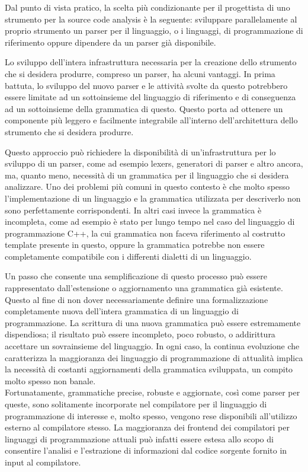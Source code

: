 Dal punto di vista pratico, la scelta più condizionante per il progettista di
uno strumento per la source code analysis è la seguente: sviluppare
parallelamente al proprio strumento un parser per il linguaggio, o i linguaggi,
di programmazione di riferimento oppure dipendere da un parser già disponibile.

Lo sviluppo dell’intera infrastruttura necessaria per la creazione dello
strumento che si desidera produrre, compreso un parser, ha alcuni vantaggi. In
prima battuta, lo sviluppo del nuovo parser e le attività svolte da questo
potrebbero essere limitate ad un sottoinsieme del linguaggio di riferimento e di
conseguenza ad un sottoinsieme della grammatica di questo. Questo porta ad
ottenere un componente più leggero e facilmente integrabile all'interno
dell'architettura dello strumento che si desidera produrre.

Questo approccio può richiedere la disponibilità di un’infrastruttura per lo
sviluppo di un parser, come ad esempio lexers, generatori di parser e altro
ancora, ma, quanto meno, necessità di un grammatica per il linguaggio che si
desidera analizzare. Uno dei problemi più comuni in questo contesto è che molto
spesso l’implementazione di un linguaggio e la grammatica utilizzata per
descriverlo non sono perfettamente corrispondenti. In altri casi invece la
grammatica è incompleta, come ad esempio è stato per lungo tempo nel caso del
linguaggio di programmazione C++, la cui grammatica non faceva riferimento al
costrutto template presente in questo, oppure la grammatica potrebbe non essere
completamente compatibile con i differenti dialetti di un linguaggio.

Un passo che consente una semplificazione di questo processo può essere
rappresentato dall'estensione o aggiornamento una grammatica già esistente.
Questo al fine di non dover necessariamente definire una formalizzazione
completamente nuova dell'intera grammatica di un linguaggio di programmazione.
La scrittura di una nuova grammatica può essere estremamente dispendiosa; il
risultato può essere incompleto, poco robusto, o addirittura accettare un
sovrainsieme del linguaggio. In ogni caso, la continua evoluzione che
caratterizza la maggioranza dei linguaggio di programmazione di attualità
implica la necessità di costanti aggiornamenti della grammatica sviluppata, un
compito molto spesso non banale.\\

Fortunatamente, grammatiche precise, robuste e aggiornate, così come parser per
queste, sono solitamente incorporate nel compilatore per il linguaggio di
programmazione di interesse e, molto spesso, vengono rese disponibili
all’utilizzo esterno al compilatore stesso. La maggioranza dei frontend dei
compilatori per linguaggi di programmazione attuali può infatti essere estesa
allo scopo di consentire l’analisi e l’estrazione di informazioni dal codice
sorgente fornito in input al compilatore. \cite{gregor2012}

